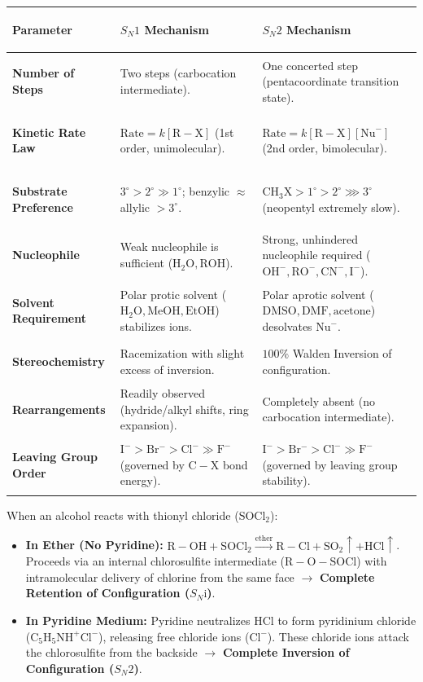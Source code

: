 \documentclass[10pt,a4paper]{article}
\begin{document}
\begin{center}
\scriptsize
\begin{tabularx}{\linewidth}{|>{\bfseries\raggedright\arraybackslash}p{2.8cm}|L|L|}
\hline
\textbf{Parameter} & \textbf{$S_N1$ Mechanism} & \textbf{$S_N2$ Mechanism} \\
\hline
\textbf{Number of Steps} & Two steps (carbocation intermediate). & One concerted step (pentacoordinate transition state). \\
\hline
\textbf{Kinetic Rate Law} & $\text{Rate} = k[\mathrm{R-X}]$ (1st order, unimolecular). & $\text{Rate} = k[\mathrm{R-X}][\mathrm{Nu}^-]$ (2nd order, bimolecular). \\
\hline
\textbf{Substrate Preference} & $3^\circ > 2^\circ \gg 1^\circ$; benzylic $\approx$ allylic $> 3^\circ$. & $\mathrm{CH_3X} > 1^\circ > 2^\circ \ggg 3^\circ$ (neopentyl extremely slow). \\
\hline
\textbf{Nucleophile} & Weak nucleophile is sufficient ($\mathrm{H_2O, ROH}$). & Strong, unhindered nucleophile required ($\mathrm{OH^-, RO^-, CN^-, I^-}$). \\
\hline
\textbf{Solvent Requirement} & Polar protic solvent ($\mathrm{H_2O, MeOH, EtOH}$) stabilizes ions. & Polar aprotic solvent ($\mathrm{DMSO, DMF, \text{acetone}}$) desolvates $\mathrm{Nu}^-$. \\
\hline
\textbf{Stereochemistry} & Racemization with slight excess of inversion. & $100\%$ Walden Inversion of configuration. \\
\hline
\textbf{Rearrangements} & Readily observed (hydride/alkyl shifts, ring expansion). & Completely absent (no carbocation intermediate). \\
\hline
\textbf{Leaving Group Order} & $\mathrm{I^- > Br^- > Cl^- \gg F^-}$ (governed by $\mathrm{C-X}$ bond energy). & $\mathrm{I^- > Br^- > Cl^- \gg F^-}$ (governed by leaving group stability). \\
\hline
\end{tabularx}
\end{center}

\begin{ncertbox}
When an alcohol reacts with thionyl chloride ($\mathrm{SOCl_2}$):
\begin{itemize}
  \item \textbf{In Ether (No Pyridine):} $\mathrm{R-OH} + \mathrm{SOCl_2} \xrightarrow{\text{ether}} \mathrm{R-Cl} + \mathrm{SO_2}\uparrow + \mathrm{HCl}\uparrow$. Proceeds via an internal chlorosulfite intermediate ($\mathrm{R-O-SOCl}$) with intramolecular delivery of chlorine from the same face $\to$ \textbf{Complete Retention of Configuration ($S_N\mathrm{i}$)}.
  \item \textbf{In Pyridine Medium:} Pyridine neutralizes $\mathrm{HCl}$ to form pyridinium chloride ($\mathrm{C_5H_5NH^+Cl^-}$), releasing free chloride ions ($\mathrm{Cl^-}$). These chloride ions attack the chlorosulfite from the backside $\to$ \textbf{Complete Inversion of Configuration ($S_N2$)}.
\end{itemize}
\end{ncertbox}
\end{document}
